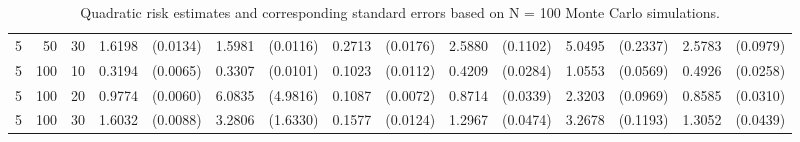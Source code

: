 \begin{table}[ht]
\begin{small}
\begin{tabular}{lrrrrrrrrrrrrrr}
  5 & 50 & 30 & 1.6198 & (0.0134) & 1.5981 & (0.0116) & 0.2713 & (0.0176) & 2.5880 & (0.1102) & 5.0495 & (0.2337) & 2.5783 & (0.0979) \\ 
  5 & 100 & 10 & 0.3194 & (0.0065) & 0.3307 & (0.0101) & 0.1023 & (0.0112) & 0.4209 & (0.0284) & 1.0553 & (0.0569) & 0.4926 & (0.0258) \\ 
  5 & 100 & 20 & 0.9774 & (0.0060) & 6.0835 & (4.9816) & 0.1087 & (0.0072) & 0.8714 & (0.0339) & 2.3203 & (0.0969) & 0.8585 & (0.0310) \\ 
  5 & 100 & 30 & 1.6032 & (0.0088) & 3.2806 & (1.6330) & 0.1577 & (0.0124) & 1.2967 & (0.0474) & 3.2678 & (0.1193) & 1.3052 & (0.0439) \\ 
   \hline
\end{tabular}
\end{small}
\caption{Quadratic risk estimates and corresponding standard errors based on N = 100 Monte Carlo simulations.} 
\end{table}

